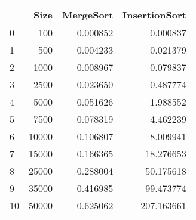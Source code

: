 \begin{tabular}{lrrr}
\toprule
{} &   Size &  MergeSort &  InsertionSort \\
\midrule
0  &    100 &   0.000852 &       0.000837 \\
1  &    500 &   0.004233 &       0.021379 \\
2  &   1000 &   0.008967 &       0.079837 \\
3  &   2500 &   0.023650 &       0.487774 \\
4  &   5000 &   0.051626 &       1.988552 \\
5  &   7500 &   0.078319 &       4.462239 \\
6  &  10000 &   0.106807 &       8.009941 \\
7  &  15000 &   0.166365 &      18.276653 \\
8  &  25000 &   0.288004 &      50.175618 \\
9  &  35000 &   0.416985 &      99.473774 \\
10 &  50000 &   0.625062 &     207.163661 \\
\bottomrule
\end{tabular}
